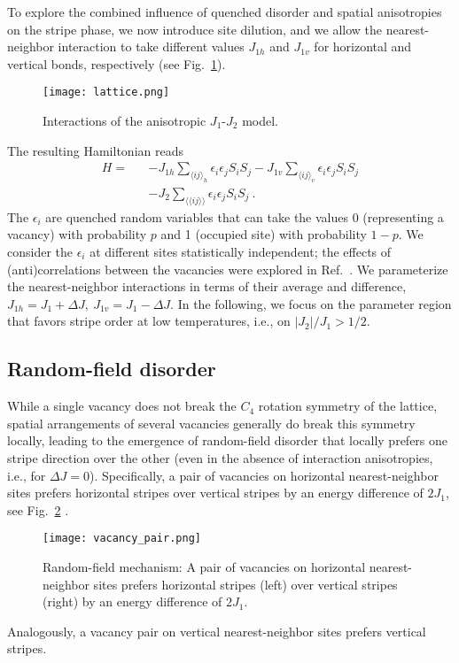 \documentclass[twocolumn,showpacs,superscriptaddress,aps,prb]{revtex4-2}
\begin{document}
To explore the combined influence of quenched disorder and spatial anisotropies on the
stripe phase, we now introduce site dilution, and we allow the nearest-neighbor interaction
to take different values $J_{1h}$ and $J_{1v}$ for horizontal and vertical bonds, respectively
(see Fig.\  \ref{fig:lattice}).
\begin{figure}
\texttt{[image: lattice.png]}
\caption{Interactions of the anisotropic $J_1$-$J_2$ model.}
\label{fig:lattice}
\end{figure}
The resulting Hamiltonian reads
\begin{eqnarray}
H =&& - J_{1h} \sum_{\langle ij \rangle_h}\epsilon_i\epsilon_j S_i S_j - J_{1v} \sum_{\langle ij \rangle_v}\epsilon_i\epsilon_j S_i S_j \nonumber \\
     && - J_2 \sum_{\langle\langle ij \rangle\rangle}\epsilon_i\epsilon_j  S_i S_j ~.
\label{eq:H}
\end{eqnarray}
The $\epsilon_i$ are quenched random variables that can take the values 0 (representing a vacancy)
with probability $p$ and 1 (occupied site) with probability $1-p$. We consider the $\epsilon_i$
at different sites statistically independent; the effects of (anti)correlations between the
vacancies were explored in Ref.\ \cite{KunwarSenVojtaNarayanan18}. We parameterize the
nearest-neighbor interactions in terms of their average and difference,
$J_{1h} = J_1 + \Delta J,~ J_{1v} = J_1 - \Delta J$. In the following, we focus on the parameter
region that favors stripe order at low temperatures, i.e., on $|J_2|/J_1 > 1/2$.


\subsection{Random-field disorder}
\label{subsec:rf}

While a single vacancy does not break the $C_4$ rotation symmetry of the lattice, spatial arrangements
of several vacancies generally do break this symmetry locally, leading to the emergence of random-field
disorder that locally prefers one stripe direction over the other (even in the absence of
interaction anisotropies, i.e., for $\Delta J=0$). Specifically, a pair of vacancies on
horizontal nearest-neighbor sites prefers
horizontal stripes over vertical stripes by an energy difference of $2 J_1$,
see Fig.\ \ref{fig:vacancy_pair} \cite{Fernandez88,KunwarSenVojtaNarayanan18}.
\begin{figure}
\texttt{[image: vacancy\_pair.png]}
\caption{Random-field mechanism: A pair of vacancies on horizontal nearest-neighbor sites prefers
horizontal stripes (left) over vertical stripes (right) by an energy difference of $2 J_1$.}
\label{fig:vacancy_pair}
\end{figure}
Analogously, a vacancy pair on vertical nearest-neighbor sites prefers vertical stripes.
\end{document}
